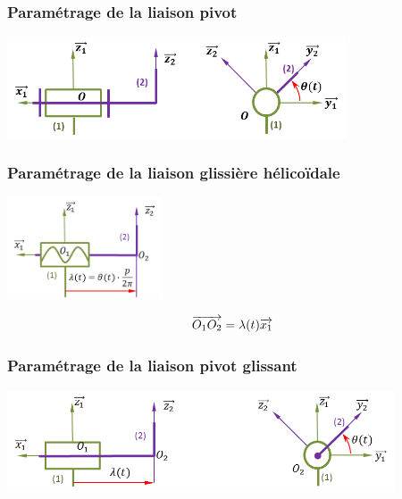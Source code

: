 \documentclass[10pt,oneside]{article}
\begin{document}
\subsubsection{Paramétrage de la liaison pivot}
\begin{minipage}[c]{.3\linewidth}
\begin{center}
\includegraphics[height=3cm]{png/pivot_p2}
\end{center}
\end{minipage} \hfill
\begin{minipage}[c]{.65\linewidth}

\end{minipage}
\subsubsection{Paramétrage de la liaison glissière hélicoïdale}
\begin{minipage}[c]{.3\linewidth}
\begin{center}
\includegraphics[height=3cm]{png/helico_p}
\end{center}
\end{minipage} \hfill
\begin{minipage}[c]{.65\linewidth}
$$
\overrightarrow{O_1 O_2} = \lambda(t) \overrightarrow{x_1}
$$
\end{minipage}

\subsubsection{Paramétrage de la liaison pivot glissant}
\begin{minipage}[c]{.3\linewidth}
\begin{center}
\includegraphics[height=3cm]{png/pivotg_p}
\end{center}
\end{minipage} \hfill
\begin{minipage}[c]{.65\linewidth}

\end{minipage}
\end{document}
